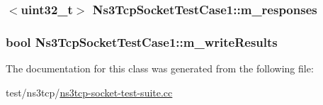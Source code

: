 \subsubsection[{\texorpdfstring{m\+\_\+responses}{m_responses}}]{$<$uint32\+\_\+t$>$ Ns3\+Tcp\+Socket\+Test\+Case1\+::m\+\_\+responses\hspace{0.3cm}{\ttfamily [private]}}\hypertarget{classNs3TcpSocketTestCase1_ada714a9630cb2f16a31abcdf8de57fb7}{}\label{classNs3TcpSocketTestCase1_ada714a9630cb2f16a31abcdf8de57fb7}
\subsubsection[{\texorpdfstring{m\+\_\+write\+Results}{m_writeResults}}]{\setlength{\rightskip}{0pt plus 5cm}bool Ns3\+Tcp\+Socket\+Test\+Case1\+::m\+\_\+write\+Results\hspace{0.3cm}{\ttfamily [private]}}\hypertarget{classNs3TcpSocketTestCase1_ade29afe16b2b075b73b708fff3d24f97}{}\label{classNs3TcpSocketTestCase1_ade29afe16b2b075b73b708fff3d24f97}


The documentation for this class was generated from the following file\+:\begin{DoxyCompactItemize}
\item 
test/ns3tcp/\hyperlink{ns3tcp-socket-test-suite_8cc}{ns3tcp-\/socket-\/test-\/suite.\+cc}\end{DoxyCompactItemize}
